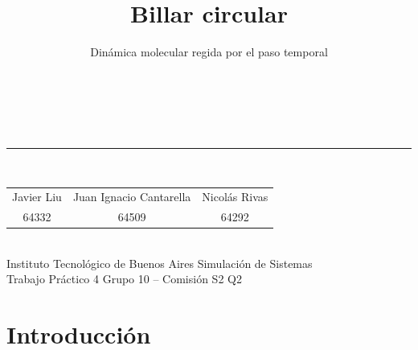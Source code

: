\documentclass[aspectratio=169,11pt]{beamer}
\title{Billar circular}
\subtitle{Dinámica molecular regida por el paso temporal}
\begin{document}
\begin{frame}
    \vfill
    \begin{center}
        {\inserttitle}\\[0.3em]
        {\large\color{gris}\insertsubtitle}\\[1.0em]
        \textcolor{azul!30}{\rule{0.45\textwidth}{1pt}}\\[1.0em]
        {\small
        \begin{tabular}{ccc}
            Javier Liu & Juan Ignacio Cantarella & Nicolás Rivas \\[0.15em]
            {\footnotesize\color{gris}64332} &
            {\footnotesize\color{gris}64509} &
            {\footnotesize\color{gris}64292}
        \end{tabular}}\\[1.4em]
        {\footnotesize Instituto Tecnológico de Buenos Aires \quad\textbar\quad Simulación de Sistemas}\\[0.3em]
        {\footnotesize\color{gris} Trabajo Práctico 4 \enspace\textbar\enspace Grupo 10 -- Comisión S2 \enspace\textbar{} Q2}
    \end{center}
    \vfill
\end{frame}

\AtBeginSection[]{%
    \begin{frame}
        \vfill
        \begin{center}
            {\Large\bfseries\color{azul}\insertsectionhead}\\[0.5em]
            \textcolor{azul!30}{\rule{0.28\textwidth}{1pt}}
        \end{center}
        \vfill
    \end{frame}}

\section{Introducción}
\end{document}
